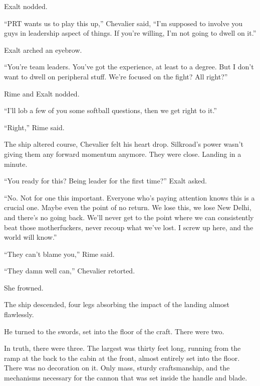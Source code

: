 Exalt nodded.



``PRT wants us to play this up,'' Chevalier said, ``I'm supposed to involve you guys in leadership aspect of things.  If you're willing, I'm not going to dwell on it.''



Exalt arched an eyebrow.



``You're team leaders.  You've got the experience, at least to a degree.  But I don't want to dwell on peripheral stuff.  We're focused on the fight?  All right?''



Rime and Exalt nodded.



``I'll lob a few of you some softball questions, then we get right to it.''



``Right,'' Rime said.



The ship altered course, Chevalier felt his heart drop.  Silkroad's power wasn't giving them any forward momentum anymore.  They were close.  Landing in a minute.



``You ready for this?  Being leader for the first time?''  Exalt asked.



``No.  Not for one this important.  Everyone who's paying attention knows this is a crucial one.  Maybe even the point of no return.  We lose this, we lose New Delhi, and there's no going back.  We'll never get to the point where we can consistently beat those motherfuckers, never recoup what we've lost.  I screw up here, and the world will know.''



``They can't blame you,'' Rime said.



``They damn well can,'' Chevalier retorted.



She frowned.



The ship descended, four legs absorbing the impact of the landing almost flawlessly.



He turned to the swords, set into the floor of the craft.  There were two.



In truth, there were three.  The largest was thirty feet long, running from the ramp at the back to the cabin at the front, almost entirely set into the floor.  There was no decoration on it.  Only mass, sturdy craftsmanship, and the mechanisms necessary for the cannon that was set inside the handle and blade.



